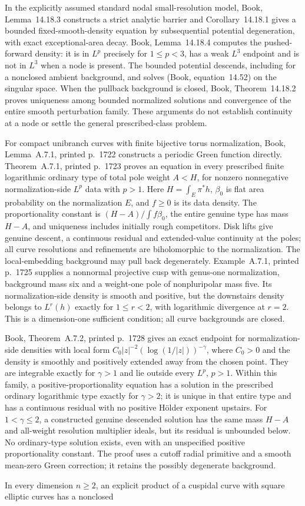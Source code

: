 \documentclass[11pt]{article}
\begin{document}
 In the explicitly assumed standard nodal small-resolution model, Book, Lemma~14.18.3 constructs a strict analytic barrier and Corollary~14.18.1 gives a bounded fixed-smooth-density equation by subsequential potential degeneration, with exact exceptional-area decay. Book, Lemma~14.18.4 computes the pushed-forward density: it is in $L^p$ precisely for $1\leq p<3$, has a weak $L^3$ endpoint and is not in $L^3$ when a node is present. The bounded potential descends, including for a nonclosed ambient background, and solves (Book, equation~14.52) on the singular space. When the pullback background is closed, Book, Theorem~14.18.2 proves uniqueness among bounded normalized solutions and convergence of the entire smooth perturbation family. These arguments do not establish continuity at a node or settle the general prescribed-class problem.\par For compact unibranch curves with finite bijective torus normalization, Book, Lemma~A.7.1, printed p.~1722 constructs a periodic Green function directly. Theorem~A.7.1, printed p.~1723 proves an equation in every prescribed finite logarithmic ordinary type of total pole weight $A<H$, for nonzero nonnegative normalization-side $L^p$ data with $p>1$. Here $H=\int_E\pi^*h$, $\beta_0$ is flat area probability on the normalization $E$, and $f\geq0$ is its data density. The proportionality constant is $(H-A)/\int f\beta_0$, the entire genuine type has mass $H-A$, and uniqueness includes initially rough competitors. Disk lifts give genuine descent, a continuous residual and extended-value continuity at the poles; all curve resolutions and refinements are biholomorphic to the normalization. The local-embedding background may pull back degenerately. Example~A.7.1, printed p.~1725 supplies a nonnormal projective cusp with genus-one normalization, background mass six and a weight-one pole of nonpluripolar mass five. Its normalization-side density is smooth and positive, but the downstairs density belongs to $L^r(h)$ exactly for $1\leq r<2$, with logarithmic divergence at $r=2$. This is a dimension-one sufficient condition; all curve backgrounds are closed.\par Book, Theorem~A.7.2, printed p.~1728 gives an exact endpoint for normalization-side densities with local form $C_0|z|^{-2}(\log(1/|z|))^{-\gamma}$, where $C_0>0$ and the density is smoothly and positively extended away from the chosen point. They are integrable exactly for $\gamma>1$ and lie outside every $L^p$, $p>1$. Within this family, a positive-proportionality equation has a solution in the prescribed ordinary logarithmic type exactly for $\gamma>2$; it is unique in that entire type and has a continuous residual with no positive H\"older exponent upstairs. For $1<\gamma\leq2$, a constructed genuine descended solution has the same mass $H-A$ and all-weight resolution multiplier ideals, but its residual is unbounded below. No ordinary-type solution exists, even with an unspecified positive proportionality constant. The proof uses a cutoff radial primitive and a smooth mean-zero Green correction; it retains the possibly degenerate background.\par In every dimension $n\geq2$, an explicit product of a cuspidal curve with square elliptic curves has a nonclosed 
\end{document}
